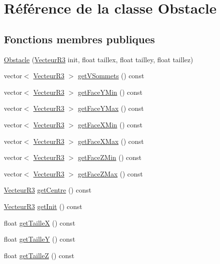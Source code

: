 \hypertarget{class_obstacle}{}\section{Référence de la classe Obstacle}
\label{class_obstacle}
\subsection*{Fonctions membres publiques}
\begin{DoxyCompactItemize}
\item 
\mbox{\hyperlink{class_obstacle_a72592db48f03233910c3c33145b96fd8}{Obstacle}} (\mbox{\hyperlink{class_vecteur_r3}{Vecteur\+R3}} init, float taillex, float tailley, float taillez)
\item 
vector$<$ \mbox{\hyperlink{class_vecteur_r3}{Vecteur\+R3}} $>$ \mbox{\hyperlink{class_obstacle_a5d69ba210a162084a37e246e3afc8574}{get\+V\+Sommets}} () const
\item 
vector$<$ \mbox{\hyperlink{class_vecteur_r3}{Vecteur\+R3}} $>$ \mbox{\hyperlink{class_obstacle_ac3d65b0cf5addfb7058e93d9fd36f8d2}{get\+Face\+Y\+Min}} () const
\item 
vector$<$ \mbox{\hyperlink{class_vecteur_r3}{Vecteur\+R3}} $>$ \mbox{\hyperlink{class_obstacle_abc88684297b935308cd23f0155df9fe9}{get\+Face\+Y\+Max}} () const
\item 
vector$<$ \mbox{\hyperlink{class_vecteur_r3}{Vecteur\+R3}} $>$ \mbox{\hyperlink{class_obstacle_ab0e0bd5dac1a93875b521536b65b148c}{get\+Face\+X\+Min}} () const
\item 
vector$<$ \mbox{\hyperlink{class_vecteur_r3}{Vecteur\+R3}} $>$ \mbox{\hyperlink{class_obstacle_a03ada1e0aaa5825666010b60a840bed4}{get\+Face\+X\+Max}} () const
\item 
vector$<$ \mbox{\hyperlink{class_vecteur_r3}{Vecteur\+R3}} $>$ \mbox{\hyperlink{class_obstacle_ae5d613bc2ff1f6c94e39db0855d63ade}{get\+Face\+Z\+Min}} () const
\item 
vector$<$ \mbox{\hyperlink{class_vecteur_r3}{Vecteur\+R3}} $>$ \mbox{\hyperlink{class_obstacle_a24887a162d5b7f8929c1bbae64bc70f5}{get\+Face\+Z\+Max}} () const
\item 
\mbox{\hyperlink{class_vecteur_r3}{Vecteur\+R3}} \mbox{\hyperlink{class_obstacle_a5f89117927ab1b5a3115f19ac21e0088}{get\+Centre}} () const
\item 
\mbox{\hyperlink{class_vecteur_r3}{Vecteur\+R3}} \mbox{\hyperlink{class_obstacle_a3520ca88bf9ea322647b1f3382dc0916}{get\+Init}} () const
\item 
float \mbox{\hyperlink{class_obstacle_a4cdb40f3bee6d9a9fad25ecfc831001f}{get\+TailleX}} () const
\item 
float \mbox{\hyperlink{class_obstacle_a14415e4953536b30e2ebf57112a92807}{get\+TailleY}} () const
\item 
float \mbox{\hyperlink{class_obstacle_ab2267f4612ffb80352494525040e8f91}{get\+TailleZ}} () const
\end{DoxyCompactItemize}


